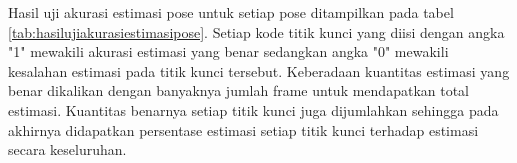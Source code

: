 Hasil uji akurasi estimasi pose untuk setiap pose ditampilkan pada tabel \ref{tab:hasilujiakurasiestimasipose}.
Setiap kode titik kunci yang diisi dengan angka "1" mewakili akurasi estimasi yang benar
sedangkan angka "0" mewakili kesalahan estimasi pada titik kunci tersebut.
Keberadaan kuantitas estimasi yang benar dikalikan dengan banyaknya jumlah frame untuk mendapatkan
total estimasi. Kuantitas benarnya setiap titik kunci juga dijumlahkan sehingga pada akhirnya
didapatkan persentase estimasi setiap titik kunci terhadap estimasi secara keseluruhan.

\pagebreak

\begin{table}[htbp]
    \captionsetup{labelfont=bf, textfont=bf}
    \caption{Hasil Uji Akurasi Estimasi Pose}
    \label{tab:hasilujiakurasiestimasipose}
    \vspace{-20pt}
    \begin{center}
\end{center}
\end{table}
